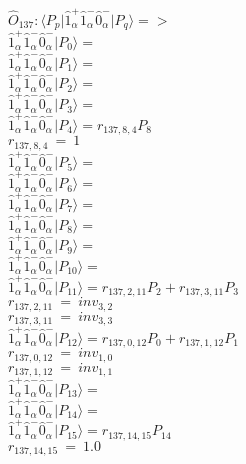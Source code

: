 \documentclass[14pt]{article}
\begin{document}
    $\hat{O}_{137}:  \langle{P_p}\vert \hat{1}_{\alpha}^{+}\hat{1}_{\alpha}^{-}\hat{0}_{\alpha}^{-} \vert{P_q}\rangle => $ \\ 
    $ \hat{1}_{\alpha}^{+}\hat{1}_{\alpha}^{-}\hat{0}_{\alpha}^{-} \vert{P_{0}}\rangle =  $ \\ 
    $ \hat{1}_{\alpha}^{+}\hat{1}_{\alpha}^{-}\hat{0}_{\alpha}^{-} \vert{P_{1}}\rangle =  $ \\ 
    $ \hat{1}_{\alpha}^{+}\hat{1}_{\alpha}^{-}\hat{0}_{\alpha}^{-} \vert{P_{2}}\rangle =  $ \\ 
    $ \hat{1}_{\alpha}^{+}\hat{1}_{\alpha}^{-}\hat{0}_{\alpha}^{-} \vert{P_{3}}\rangle =  $ \\ 
    $ \hat{1}_{\alpha}^{+}\hat{1}_{\alpha}^{-}\hat{0}_{\alpha}^{-} \vert{P_{4}}\rangle = {r}_{137,8,4}P_{8} $ \\ 
    ${r}_{137,8,4}\ =\ 1 $ \\ 
    $ \hat{1}_{\alpha}^{+}\hat{1}_{\alpha}^{-}\hat{0}_{\alpha}^{-} \vert{P_{5}}\rangle =  $ \\ 
    $ \hat{1}_{\alpha}^{+}\hat{1}_{\alpha}^{-}\hat{0}_{\alpha}^{-} \vert{P_{6}}\rangle =  $ \\ 
    $ \hat{1}_{\alpha}^{+}\hat{1}_{\alpha}^{-}\hat{0}_{\alpha}^{-} \vert{P_{7}}\rangle =  $ \\ 
    $ \hat{1}_{\alpha}^{+}\hat{1}_{\alpha}^{-}\hat{0}_{\alpha}^{-} \vert{P_{8}}\rangle =  $ \\ 
    $ \hat{1}_{\alpha}^{+}\hat{1}_{\alpha}^{-}\hat{0}_{\alpha}^{-} \vert{P_{9}}\rangle =  $ \\ 
    $ \hat{1}_{\alpha}^{+}\hat{1}_{\alpha}^{-}\hat{0}_{\alpha}^{-} \vert{P_{10}}\rangle =  $ \\ 
    $ \hat{1}_{\alpha}^{+}\hat{1}_{\alpha}^{-}\hat{0}_{\alpha}^{-} \vert{P_{11}}\rangle = {r}_{137,2,11}P_{2}+{r}_{137,3,11}P_{3} $ \\ 
    ${r}_{137,2,11}\ =\ {inv}_{3,2} $ \\ 
    ${r}_{137,3,11}\ =\ {inv}_{3,3} $ \\ 
    $ \hat{1}_{\alpha}^{+}\hat{1}_{\alpha}^{-}\hat{0}_{\alpha}^{-} \vert{P_{12}}\rangle = {r}_{137,0,12}P_{0}+{r}_{137,1,12}P_{1} $ \\ 
    ${r}_{137,0,12}\ =\ {inv}_{1,0} $ \\ 
    ${r}_{137,1,12}\ =\ {inv}_{1,1} $ \\ 
    $ \hat{1}_{\alpha}^{+}\hat{1}_{\alpha}^{-}\hat{0}_{\alpha}^{-} \vert{P_{13}}\rangle =  $ \\ 
    $ \hat{1}_{\alpha}^{+}\hat{1}_{\alpha}^{-}\hat{0}_{\alpha}^{-} \vert{P_{14}}\rangle =  $ \\ 
    $ \hat{1}_{\alpha}^{+}\hat{1}_{\alpha}^{-}\hat{0}_{\alpha}^{-} \vert{P_{15}}\rangle = {r}_{137,14,15}P_{14} $ \\ 
    ${r}_{137,14,15}\ =\ 1.0 $ \\ 
    
\end{document}

